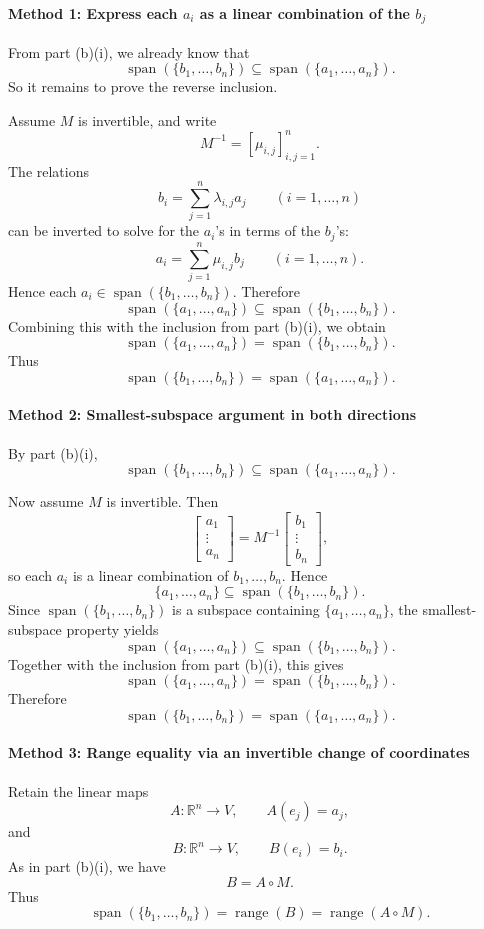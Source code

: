 \documentclass[12pt]{article}
\newcommand{\R}{\mathbb{R}}
\DeclareMathOperator{\Range}{range}
\newcommand{\Span}{\operatorname{span}}
\begin{document}
\paragraph{Method 1: Express each \(a_i\) as a linear combination of the \(b_j\)}
From part (b)(i), we already know that
\[
\Span(\{b_1,\ldots,b_n\})\subseteq \Span(\{a_1,\ldots,a_n\}).
\]
So it remains to prove the reverse inclusion.

Assume \(M\) is invertible, and write
\[
M^{-1}=[\mu_{i,j}]_{i,j=1}^n.
\]
The relations
\[
b_i=\sum_{j=1}^n \lambda_{i,j}a_j
\qquad (i=1,\ldots,n)
\]
can be inverted to solve for the \(a_i\)'s in terms of the \(b_j\)'s:
\[
a_i=\sum_{j=1}^n \mu_{i,j}b_j
\qquad (i=1,\ldots,n).
\]
Hence each \(a_i\in \Span(\{b_1,\ldots,b_n\})\). Therefore
\[
\Span(\{a_1,\ldots,a_n\})\subseteq \Span(\{b_1,\ldots,b_n\}).
\]
Combining this with the inclusion from part (b)(i), we obtain
\[
\Span(\{a_1,\ldots,a_n\})=\Span(\{b_1,\ldots,b_n\}).
\]
Thus
\[
\boxed{\Span(\{b_1,\ldots,b_n\})=\Span(\{a_1,\ldots,a_n\}).}
\]

\newpage
\paragraph{Method 2: Smallest-subspace argument in both directions}
By part (b)(i),
\[
\Span(\{b_1,\ldots,b_n\})\subseteq \Span(\{a_1,\ldots,a_n\}).
\]

Now assume \(M\) is invertible. Then
\[
\begin{bmatrix}
a_1\\ \vdots\\ a_n
\end{bmatrix}
=
M^{-1}
\begin{bmatrix}
b_1\\ \vdots\\ b_n
\end{bmatrix},
\]
so each \(a_i\) is a linear combination of \(b_1,\ldots,b_n\). Hence
\[
\{a_1,\ldots,a_n\}\subseteq \Span(\{b_1,\ldots,b_n\}).
\]
Since \(\Span(\{b_1,\ldots,b_n\})\) is a subspace containing \(\{a_1,\ldots,a_n\}\), the smallest-subspace property yields
\[
\Span(\{a_1,\ldots,a_n\})\subseteq \Span(\{b_1,\ldots,b_n\}).
\]
Together with the inclusion from part (b)(i), this gives
\[
\Span(\{a_1,\ldots,a_n\})=\Span(\{b_1,\ldots,b_n\}).
\]
Therefore
\[
\boxed{\Span(\{b_1,\ldots,b_n\})=\Span(\{a_1,\ldots,a_n\}).}
\]

\paragraph{Method 3: Range equality via an invertible change of coordinates}
Retain the linear maps
\[
A:\R^n\to V,\qquad A(e_j)=a_j,
\]
and
\[
B:\R^n\to V,\qquad B(e_i)=b_i.
\]
As in part (b)(i), we have
\[
B=A\circ M.
\]
Thus
\[
\Span(\{b_1,\ldots,b_n\})=\Range(B)=\Range(A\circ M).
\]
\end{document}
